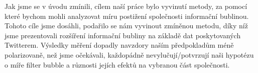 \documentclass[12pt, a4paper]{article}
\numberwithin{equation}{section} 	%
\begin{document}
Jak jsme se v úvodu zmínili, cílem naší práce bylo vyvinutí metody, za pomocí které bychom mohli analyzovat míru postižení společnosti informační bublinou. Tohoto cíle jsme dosáhli, podařilo se nám vyvinout zmíněnou metodu, díky níž jsme prezentovali rozšíření informační bubliny na základě dat poskytovaných Twitterem. Výsledky měření dopadly navzdory naším předpokladům méně polarizovaně, než jsme očekávali, každopádně nevylučují/potvrzují naši hypotézu o míře filter bubble a různosti jejích efektů na vybranou část společnosti.

\end{document}
